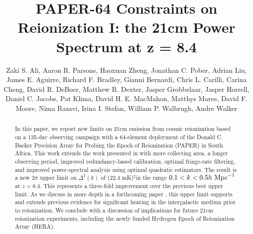 \documentclass[twocolumn,numberedappendix]{emulateapj} \shorttitle{New Limits on the 21 cm Power Spectrum at $z=8.4$}
\newcommand{\hMpci}{h\ {\rm Mpc}^{-1}}
\newcommand{\mKlimit}{(22.4 mK)$^2$}
\begin{document}
\title{PAPER-64 Constraints on Reionization I: the 21cm Power Spectrum at z = 8.4}

\author{
Zaki S. Ali, 
Aaron R. Parsons, 
Haoxuan Zheng,
Jonathan C. Pober, 
Adrian Liu, 
James E. Aguirre,
Richard F. Bradley,
Gianni Bernardi, 
Chris L. Carilli,
Carina Cheng,
David R. DeBoer, 
Matthew R. Dexter,
Jasper Grobbelaar,
Jasper Horrell,
Daniel C. Jacobs, 
Pat Klima,
David H. E. MacMahon,
Matthys Maree,
David F. Moore,
Nima Razavi,
Irina I. Stefan,
William P. Walbrugh,
Andre Walker
}


\begin{abstract}
In this paper, we report new limits on 21cm emission from cosmic reionization
based on a 135-day observing campaign with a 64-element deployment of the
Donald C. Backer Precision Array for Probing the Epoch of Reionization (PAPER)
in South Africa.  This work extends the work presented in
\citet{parsons_et_al2014} with more collecting area, a longer observing period, improved redundancy-based
calibration, optimal fringe-rate filtering, and improved power-spectral
analysis using optimal quadratic estimators. The result is a new $2\sigma$
upper limit on $\Delta^2(k)$ of \mKlimit in the range
$0.1<k<0.5\hMpci$ at $z=8.4$.  This represents a three-fold improvement over the
previous best upper limit.  As we discuss in more depth in a forthcoming
paper \citep{pober_et_al2015}, this upper limit supports and extends
previous evidence for significant heating in the intergalactic medium prior to
reionization. We conclude with a discussion of implications for future 21cm
reionization experiments, including the newly funded Hydrogen Epoch of
Reionization Array (HERA).  
\end{abstract}
\end{document}
